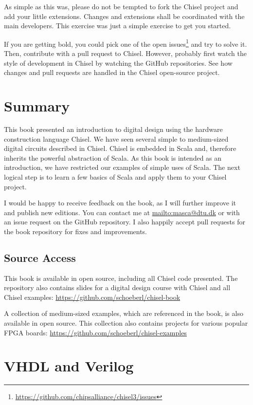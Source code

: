 \documentclass[%
    10pt,
    headinclude, footinclude=false,
    openright, %
    notitlepage,
    cleardoublepage=empty,
    headsepline,
    numbers=noenddot,
    bibliography=totoc, index=totoc,
    ]{scrbook}
\newcommand{\myref}[2]{\href{#1}{#2}}
\renewcommand{\myref}[2]{{#2}{\footnote{\url{#1}}}}
\begin{document}
As simple as this was, please do not be tempted to fork the Chisel project and
add your little extensions. Changes and extensions shall be coordinated with the
main developers.
This exercise was just a simple exercise to get you started.

If you are getting bold, you could pick one of the
\myref{https://github.com/chipsalliance/chisel3/issues}{open issues} and try to solve it.
Then, contribute with a pull request to Chisel.
However, probably first watch the style of development in Chisel by watching the GitHub
repositories.
See how changes and pull requests are handled in the Chisel open-source project.


\chapter{Summary}
\label{sec:conclusion}

This book presented an introduction to digital design using the
hardware construction language Chisel.
We have seen several simple to medium-sized digital circuits
described in Chisel.
Chisel is embedded in Scala and, therefore inherits the powerful
abstraction of Scala.
As this book is intended as an introduction, we have restricted
our examples of simple uses of Scala.
The next logical step is to learn a few basics of Scala and apply them
to your Chisel project.

I would be happy to receive feedback on the book, as I will further
improve it and publish new editions. You can contact me at
\url{mailto:masca@dtu.dk} or with an issue request on the GitHub
repository. I also happily accept pull requests
for the book repository for fixes and improvements.

\section*{Source Access}

This book is available in open source, including all Chisel code presented.
The repository also contains slides for a digital design course with Chisel and
all Chisel examples: \url{https://github.com/schoeberl/chisel-book}

A collection of medium-sized examples, which are referenced
in the book, is also available in open source. This collection
also contains projects for various popular FPGA boards:
\url{https://github.com/schoeberl/chisel-examples}

\appendix

\chapter{VHDL and Verilog}
\end{document}

